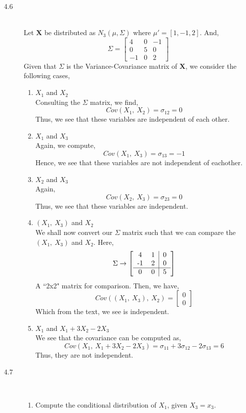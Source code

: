 \documentclass[letterpaper,10pt]{article}
\begin{document}
\begin{description}
\item[4.6]\hfill\\
Let $\textbf{X}$ be distributed as $N_3(\mu,\Sigma)$ where $\mu'=[1,-1,2]$. And,
\[\Sigma=\begin{bmatrix}
4 & 0 & -1\\0 & 5 & 0\\-1 & 0 & 2
\end{bmatrix} \]
Given that $\Sigma$ is the Variance-Covariance matrix of $\textbf{X}$, we consider the following cases,
\begin{enumerate}[label=\alph*.]
\item $X_1$ and $X_2$\\
Consulting the $\Sigma$ matrix, we find,
\[Cov(X_1,\ X_2)=\sigma_{12}=0\]
Thus, we see that these variables are independent of each other.
\item $X_1$ and $X_3$\\
Again, we compute,
\[Cov(X_1,\ X_3)=\sigma_{13}=-1\]
Hence, we see that these variables are not independent of eachother.
\item $X_2$ and $X_3$\\
Again,
\[Cov(X_2,\ X_3)=\sigma_{23}=0\]
Thus, we see that these variables are independent.
\item $(X_1,\ X_3)$ and $X_2$\\
We shall now convert our $\Sigma$ matrix such that we can compare the $(X_1,\ X_3)$ and $X_2$. Here,
\[\Sigma \to \left[\begin{tabular}{cc|c}
4 & 1 & 0\\
-1 & 2 & 0\\\hline
0 & 0 & 5
\end{tabular} \right] \]
A ``2x2" matrix for comparison. Then, we have,
\[Cov((X_1,\ X_3),\ X_2)=\begin{bmatrix}
0\\0
\end{bmatrix}\]
Which from the text, we see is independent.
\item $X_1$ and $X_1+3X_2-2X_3$\\
We see that the covariance can be computed as,
\[Cov(X_1,\ X_1+3X_2-2X_3)=\sigma_{11}+3\sigma_{12}-2\sigma_{13}=6\]
Thus, they are not independent.
\end{enumerate}
\item[4.7]\hfill\\
\begin{enumerate}[label=\alph*.]
\item Compute the conditional distribution of $X_1$, given $X_3=x_3$.\\

\end{enumerate}
\end{description}
\end{document}
